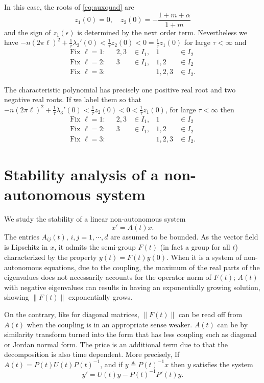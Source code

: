 \documentclass[a4paper,11pt]{article}
\def\l{(2\pi \ell)}
\theoremstyle{remark}
\begin{document}
 In this case, the roots of \eqref{eq:auxquad} are
$$ z_1(0)=0, \quad z_2(0) = -\frac{1+m+\alpha}{1+m}$$
and the sign of $z_1(\epsilon)$ is determined by the next order term. Nevertheless we have
$-n\l^2 + \frac{1}{\tau}\lambda_3'(0)<\frac{1}{\tau}z_2(0)<0=\frac{1}{\tau}z_1(0)$ for large $\tau<\infty$ and
\begin{align*}
  \text{Fix $\ell=1$:}&& 2,3&\in I_1, & 1&\in I_2\\
  \text{Fix $\ell=2$:}&& 3&\in I_1, & 1,2&\in I_2\\
  \text{Fix $\ell=3$:}&& & & 1,2,3&\in I_2.
\end{align*}

The characteristic polynomial has precisely one positive real root and two negative real roots. If we label them so that
$-n\l^2 + \frac{1}{\tau}\lambda_3'(0)<\frac{1}{\tau}z_2(0)<0<\frac{1}{\tau}z_1(0)$, for large $\tau<\infty$ then
\begin{align*}
  \text{Fix $\ell=1$:}&& 2,3&\in I_1, & 1&\in I_2\\
  \text{Fix $\ell=2$:}&& 3&\in I_1, & 1,2&\in I_2\\
  \text{Fix $\ell=3$:}&& & & 1,2,3&\in I_2.
\end{align*}

\section{Stability analysis of a non-autonomous system}
We study the stability of a linear non-autonomous system
$$ x'=A(t) x.$$%
The entries $A_{ij}(t)$, $i,j=1,\cdots,d$ are assumed to be bounded. As the vector field is Lipschitz in $x$, it admits the semi-group $F(t)$ (in fact a group for all $t$) characterized by the property $y(t)=F(t)y(0)$. When it is a system of non-autonomous equations, due to the coupling, the maximum of the real parts of the eigenvalues does not necessarily accounts for the operator norm of $F(t)$; $A(t)$ with negative eigenvalues can results in having an exponentially growing solution, showing $\|F(t)\|$ exponentially grows.

On the contrary, like for diagonal matrices, $\|F(t)\|$ can be read off from $A(t)$ when the coupling is in an appropriate sense weaker. $A(t)$ can be by similarity transform turned into the form that has less coupling such as diagonal or Jordan normal form. The price is an additional term due to that the decomposition is also time dependent. More precisely, If $A(t) = P(t)U(t)P(t)^{-1}$, and if $y\triangleq P(t)^{-1}x$ then $y$ satisfies the system
\begin{equation} y' = U(t)y - P(t)^{-1}P'(t)y. \label{eq:after_fact} \end{equation}
\end{document}
